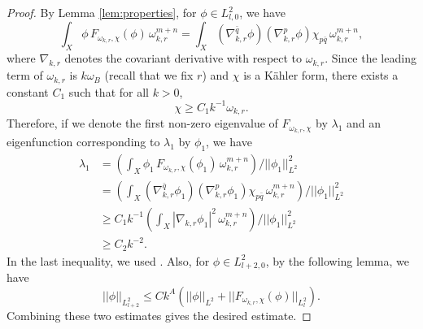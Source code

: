 \documentclass{amsart}
\numberwithin{equation}{section}
\theoremstyle{plain}
\theoremstyle{definition}
\theoremstyle{remark}
\begin{document}
\begin{proof}
By Lemma \ref{lem:properties}, for $\phi \in L^2_{l, 0}$, we have 
$$\int_X \phi \, F_{\omega_{k,r}, \chi}(\phi) \, \omega_{k,r}^{m+n}
= \int_X \left( \nabla^{\bar{q}}_{k,r} \phi \right) \left( \nabla^p_{k,r} \phi \right) \chi_{p \bar{q}} \, \omega_{k,r}^{m+n},$$
where $\nabla_{k,r}$ denotes the covariant derivative with respect to $\omega_{k,r}$.
Since the leading term of $\omega_{k,r}$ is $k \omega_B$ (recall that we fix $r$) and $\chi$ is a K{\"a}hler form, there exists a constant $C_1$ such that for all $k>0$,
$$ \chi \ge C_1 k^{-1} \omega_{k,r}.$$ 
Therefore, if we denote the first non-zero eigenvalue of $F_{\omega_{k,r}, \chi}$  by $\lambda_1$ and an eigenfunction corresponding to $\lambda_1$  by $\phi_1$, we have
\begin{align*}
\lambda_1 &= \left( \int_X {\phi_1} \, F_{\omega_{k,r}, \chi} \left( \phi_1 \right) \, \omega_{k,r}^{m+n} \right) \Big/ {||\phi_1||^2_{L^2}} \\
&=\left( \int_X \left( \nabla^{\bar{q}}_{k,r} \phi_1 \right) \left( \nabla^p_{k,r} \phi_1 \right) \chi_{p \bar{q}} \, \omega_{k,r}^{m+n} \right) \Big/ {||\phi_1||^2_{L^2}} \\
& \ge C_1 k^{-1} \left( \int_X |\nabla_{k,r} \phi_1|^2 \, \omega_{k,r}^{m+n} \right) \Big/ {||\phi_1||^2_{L^2}} \\
& \ge C_2 k^{-2}.
\end{align*}
In the last inequality, we used \cite[Lemma 6.5]{Fine}. Also, for $\phi \in L^2_{l+2,0}$, by the following lemma, we have
$$ ||\phi||_{L^2_{l+2}} \le C k^A\left( ||\phi||_{L^2} + ||F_{\omega_{k,r}, \chi}(\phi)||_{L^2_l} \right).$$
Combining these two estimates gives the desired estimate.
\end{proof}
\end{document}
